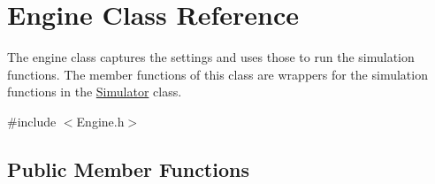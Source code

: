 \hypertarget{class_engine}{}\section{Engine Class Reference}
\label{class_engine}


The engine class captures the settings and uses those to run the simulation functions. The member functions of this class are wrappers for the simulation functions in the \mbox{\hyperlink{class_simulator}{Simulator}} class.  




{\ttfamily \#include $<$Engine.\+h$>$}

\subsection*{Public Member Functions}
